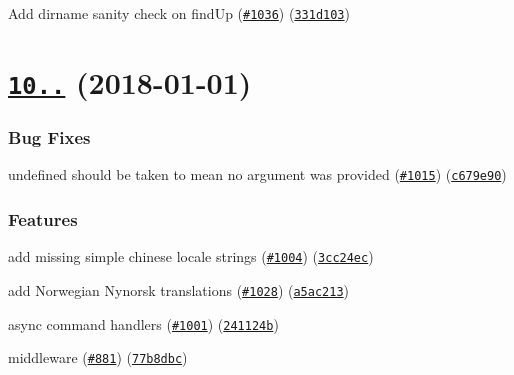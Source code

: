 \begin{DoxyItemize}
\item Add {\ttfamily dirname} sanity check on {\ttfamily find\+Up} (\href{https://github.com/yargs/yargs/issues/1036}{\tt \#1036}) (\href{https://github.com/yargs/yargs/commit/331d103}{\tt 331d103})
\end{DoxyItemize}

\label{_10.1.0}%
 \section*{\href{https://github.com/yargs/yargs/compare/v10.0.3...v10.1.0}{\tt 10..} (2018-\/01-\/01)}

\subsubsection*{Bug Fixes}


\begin{DoxyItemize}
\item \textquotesingle{}undefined\textquotesingle{} should be taken to mean no argument was provided (\href{https://github.com/yargs/yargs/issues/1015}{\tt \#1015}) (\href{https://github.com/yargs/yargs/commit/c679e90}{\tt c679e90})
\end{DoxyItemize}

\subsubsection*{Features}


\begin{DoxyItemize}
\item add missing simple chinese locale strings (\href{https://github.com/yargs/yargs/issues/1004}{\tt \#1004}) (\href{https://github.com/yargs/yargs/commit/3cc24ec}{\tt 3cc24ec})
\item add Norwegian Nynorsk translations (\href{https://github.com/yargs/yargs/issues/1028}{\tt \#1028}) (\href{https://github.com/yargs/yargs/commit/a5ac213}{\tt a5ac213})
\item async command handlers (\href{https://github.com/yargs/yargs/issues/1001}{\tt \#1001}) (\href{https://github.com/yargs/yargs/commit/241124b}{\tt 241124b})
\item middleware (\href{https://github.com/yargs/yargs/issues/881}{\tt \#881}) (\href{https://github.com/yargs/yargs/commit/77b8dbc}{\tt 77b8dbc})
\end{DoxyItemize}

\label{_10.0.3}%
